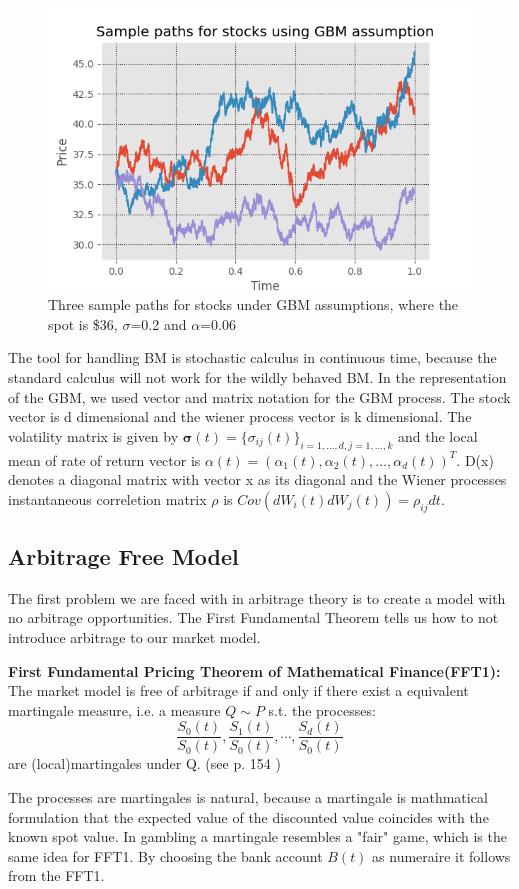 \begin{figure}[H]
\centering
\includegraphics{Figures/samplePath.png}
\decoRule
\caption[Sample Path For Stocks]{Three sample paths for stocks under GBM assumptions, where the spot is \$36, $\sigma$=0.2 and $\alpha$=0.06}
\label{fig:BM}
\end{figure}


The tool for handling BM is stochastic calculus in continuous time, because the standard calculus will not work for the wildly behaved BM. In the representation of the GBM, we used vector and matrix notation for the GBM process. The stock vector is d dimensional and the wiener process vector is k dimensional. The volatility matrix is given by $\bm{\sigma}(t)=\{\sigma_{ij}(t)\}_{i=1,\ldots,d,j=1,\ldots,k}$ and the local mean of rate of return vector is $\alpha(t)=(\alpha_1(t), \alpha_2(t), \ldots, \alpha_d(t))^T$. D(x) denotes a diagonal matrix with vector x as its diagonal and the Wiener processes instantaneous correletion matrix $\rho$ is $Cov(dW_i(t)dW_j(t))=\rho_{ij}dt$.

\subsection{Arbitrage Free Model}
The first problem we are faced with in arbitrage theory is to create a model with no arbitrage opportunities. The First Fundamental Theorem tells us how to not introduce arbitrage to our market model.
\begin{theorem}\label{FFT1}
\textbf{First Fundamental Pricing Theorem of Mathematical Finance(FFT1): } The market model is free of arbitrage if and only if there exist a equivalent martingale measure, i.e. a measure $Q\sim P$ s.t. the processes:
$$\frac{S_0(t)}{S_0(t)}, \frac{S_1(t)}{S_0(t)}, \cdots, \frac{S_d(t)}{S_0(t)}$$
are (local)martingales under Q.
(see p. 154 \parencite{finKont})
\end{theorem}
The processes are martingales is natural, because a martingale is mathmatical formulation that the expected value of the discounted value coincides with the known spot value. In gambling a martingale resembles a "fair" game, which is the same idea for FFT1. By choosing the bank account $B(t)$ as numeraire it follows from the FFT1.

